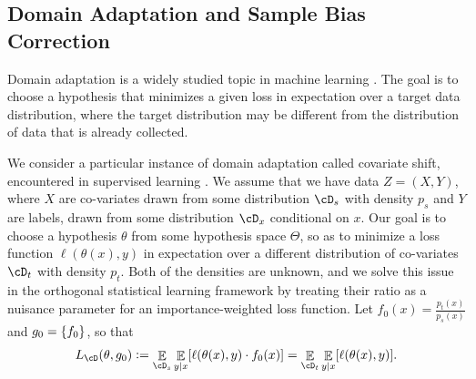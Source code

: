 \documentclass[11pt]{article} %
\theoremstyle{theorem}  %
\theoremstyle{plain}
\DeclarePairedDelimiter{\brk}{[}{]}
\DeclarePairedDelimiter{\crl}{\{}{\}}
\DeclareMathOperator{\En}{\mathbb{E}}
\newcommand{\ldef}{\vcentcolon=}
\newcommand{\poprisk}{L_{\cD}}
\newcommand{\target}{\Theta}
\begin{document}
\subsection{Domain Adaptation and Sample Bias Correction}

Domain adaptation is a widely studied topic in machine learning \citep{daume2006domain,jiang2007instance,ben2007analysis,blitzer2008learning,mansour2009domain}. The goal is to choose a hypothesis that minimizes a given loss in expectation over a target data distribution, where the target distribution may be different from the distribution of data that is already collected. 

We consider a particular instance of domain adaptation called covariate shift, encountered in supervised learning \citep{shimodaira2000improving}. We assume that we have data $Z=(X, Y)$, where $X$ are co-variates drawn from some distribution $\cD_s$ with density $p_s$ and $Y$ are labels, drawn from some distribution $\cD_x$ conditional on $x$. Our goal is to choose a hypothesis $\theta$ from some hypothesis space $\target$, so as to minimize a loss function $\ell(\theta(x), y)$ in expectation over a different distribution of co-variates $\cD_t$ with density $p_t$. Both of the densities are unknown, and we solve this issue in the orthogonal statistical learning framework by treating their ratio as a nuisance parameter for an importance-weighted loss function. Let $f_0(x) = \frac{p_t(x)}{p_s(x)}$ and $g_0=\crl*{f_0}$, so that
\begin{equation}\label{eq:domain_adaptation}
\poprisk(\theta, g_0) \ldef \En_{\cD_s}\En_{y\mid{}x}\brk*{\ell(\theta(x), y)\cdot{}f_0(x)}=\En_{\cD_t}\En_{y\mid{}x}\brk*{\ell(\theta(x), y)}.
\end{equation}
\end{document}
